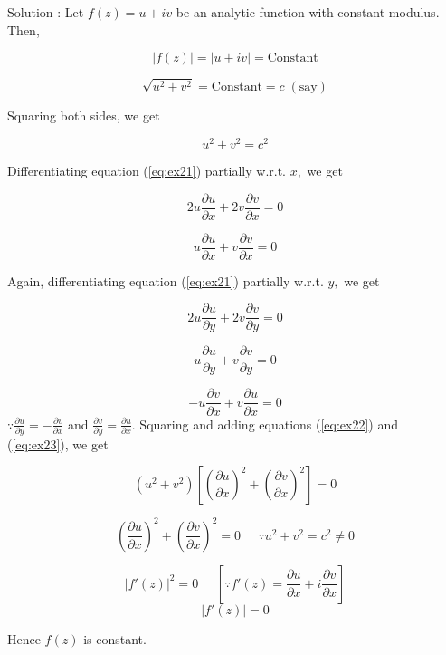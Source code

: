 \begin{solution}

Solution : Let $f(z)=u+iv$ be an analytic function with constant
modulus. Then,

\[
|f(z)|=|u+iv|=\text{Constant}\]
 

\[
\sqrt{u^{2}+v^{2}}=\text{Constant}=c\;(\text{say})\]


Squaring both sides, we get 

\begin{equation}
u^{2}+v^{2}=c^{2}\label{eq:ex21}\end{equation}


Differentiating equation (\ref{eq:ex21}) partially w.r.t. $x,$ we
get 

\[
2u\frac{\partial u}{\partial x}+2v\frac{\partial v}{\partial x}=0\]


\begin{equation}
u\frac{\partial u}{\partial x}+v\frac{\partial v}{\partial x}=0\label{eq:ex22}\end{equation}


Again, differentiating equation (\ref{eq:ex21}) partially w.r.t.
$y,$ we get 

\[
2u\frac{\partial u}{\partial y}+2v\frac{\partial v}{\partial y}=0\]


\[
u\frac{\partial u}{\partial y}+v\frac{\partial v}{\partial y}=0\]


\begin{equation}
-u\frac{\partial v}{\partial x}+v\frac{\partial u}{\partial x}=0\label{eq:ex23}\end{equation}
 $\because\frac{\partial u}{\partial y}=-\frac{\partial v}{\partial x}$
and $\frac{\partial v}{\partial y}=\frac{\partial u}{\partial x}$.
Squaring and adding equations (\ref{eq:ex22}) and (\ref{eq:ex23}),
we get 

\[
(u^{2}+v^{2})\left[\left(\frac{\partial u}{\partial x}\right)^{2}+\left(\frac{\partial v}{\partial x}\right)^{2}\right]=0\]


\[
\left(\frac{\partial u}{\partial x}\right)^{2}+\left(\frac{\partial v}{\partial x}\right)^{2}=0\;\;\;\;\;\because u^{2}+v^{2}=c^{2}\ne0\]


\[
|f'(z)|^{2}=0\;\;\;\;\;[\because f'(z)=\frac{\partial u}{\partial x}+i\frac{\partial v}{\partial x}]\]
\[
|f'(z)|=0\]


Hence $f(z)$ is constant.

\end{solution}
